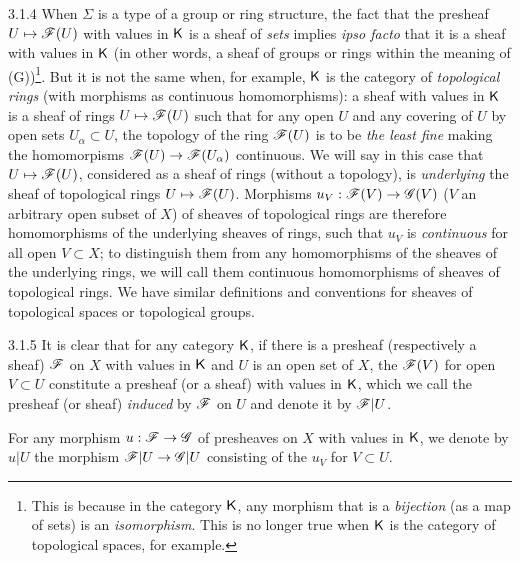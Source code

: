 \begin{env}{3.1.4}
\label{env-0.3.1.4}
When $\Sigma$ is a type of a group or ring structure, the fact that the presheaf
$U\mapsto\mathscr{F}(U)$ with values in $\mathsf{K}$ is a sheaf of \emph{sets} implies
\emph{ipso facto} that it is a sheaf with values in $\mathsf{K}$ (in other words, a
sheaf of groups or rings within the meaning of (G))\footnote{This is because in
the category $\mathsf{K}$, any morphism that is a \emph{bijection} (as a map of sets) is
an \emph{isomorphism}. This is no longer true when $\mathsf{K}$ is the category of
topological spaces, for example.}. But it is not the same when, for example,
$\mathsf{K}$ is the category of \emph{topological rings} (with morphisms as continuous
homomorphisms): a sheaf with values in $\mathsf{K}$ is a sheaf of rings
$U\mapsto\mathscr{F}(U)$ such that for any open $U$ and any covering of $U$ by open
sets $U_\alpha\subset U$, the topology of the ring $\mathscr{F}(U)$ is to be
\emph{the least fine} making the homomorpisms $\mathscr{F}(U)\to\mathscr{F}(U_\alpha)$
continuous. We will say in this case that $U\mapsto\mathscr{F}(U)$, considered as a
sheaf of rings (without a topology), is \emph{underlying} the sheaf of
topological rings $U\mapsto\mathscr{F}(U)$. Morphisms $u_V:\mathscr{F}(V)\to\mathscr{G}(V)$
($V$ an arbitrary open subset of $X$) of sheaves of topological rings are
therefore homomorphisms of the underlying sheaves of rings, such that $u_V$ is
\emph{continuous} for all open $V\subset X$; to distinguish them from any
homomorphisms of the sheaves of the underlying rings, we will call them
continuous homomorphisms of sheaves of topological rings. We have similar
definitions and conventions for sheaves of topological spaces or topological
groups.
\end{env}

\begin{env}{3.1.5}
\label{env-0.3.1.5}
It is clear that for any category $\mathsf{K}$, if there is a presheaf (respectively a
sheaf) $\mathscr{F}$ on $X$ with values in $\mathsf{K}$ and $U$ is an open set of $X$, the
$\mathscr{F}(V)$ for open $V\subset U$ constitute a presheaf (or a sheaf) with values
in $\mathsf{K}$, which we call the presheaf (or sheaf) \emph{induced} by $\mathscr{F}$ on $U$
and denote it by $\mathscr{F}|U$.

For any morphism $u:\mathscr{F}\to\mathscr{G}$ of presheaves on $X$ with values in $\mathsf{K}$,
we denote by $u|U$ the morphism $\mathscr{F}|U\to\mathscr{G}|U$ consisting of the $u_V$
for $V\subset U$.
\end{env}

